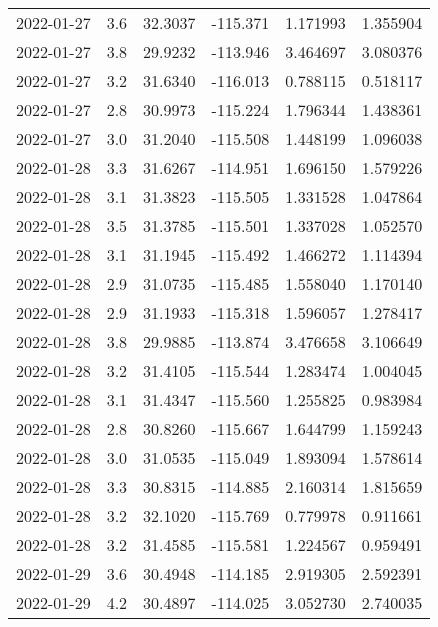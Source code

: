 \begin{tabular}{lrrrrr}
2022-01-27 &       3.6 &  32.3037 &  -115.371 &         1.171993 &         1.355904 \\
2022-01-27 &       3.8 &  29.9232 &  -113.946 &         3.464697 &         3.080376 \\
2022-01-27 &       3.2 &  31.6340 &  -116.013 &         0.788115 &         0.518117 \\
2022-01-27 &       2.8 &  30.9973 &  -115.224 &         1.796344 &         1.438361 \\
2022-01-27 &       3.0 &  31.2040 &  -115.508 &         1.448199 &         1.096038 \\
2022-01-28 &       3.3 &  31.6267 &  -114.951 &         1.696150 &         1.579226 \\
2022-01-28 &       3.1 &  31.3823 &  -115.505 &         1.331528 &         1.047864 \\
2022-01-28 &       3.5 &  31.3785 &  -115.501 &         1.337028 &         1.052570 \\
2022-01-28 &       3.1 &  31.1945 &  -115.492 &         1.466272 &         1.114394 \\
2022-01-28 &       2.9 &  31.0735 &  -115.485 &         1.558040 &         1.170140 \\
2022-01-28 &       2.9 &  31.1933 &  -115.318 &         1.596057 &         1.278417 \\
2022-01-28 &       3.8 &  29.9885 &  -113.874 &         3.476658 &         3.106649 \\
2022-01-28 &       3.2 &  31.4105 &  -115.544 &         1.283474 &         1.004045 \\
2022-01-28 &       3.1 &  31.4347 &  -115.560 &         1.255825 &         0.983984 \\
2022-01-28 &       2.8 &  30.8260 &  -115.667 &         1.644799 &         1.159243 \\
2022-01-28 &       3.0 &  31.0535 &  -115.049 &         1.893094 &         1.578614 \\
2022-01-28 &       3.3 &  30.8315 &  -114.885 &         2.160314 &         1.815659 \\
2022-01-28 &       3.2 &  32.1020 &  -115.769 &         0.779978 &         0.911661 \\
2022-01-28 &       3.2 &  31.4585 &  -115.581 &         1.224567 &         0.959491 \\
2022-01-29 &       3.6 &  30.4948 &  -114.185 &         2.919305 &         2.592391 \\
2022-01-29 &       4.2 &  30.4897 &  -114.025 &         3.052730 &         2.740035 \\

\end{tabular}
